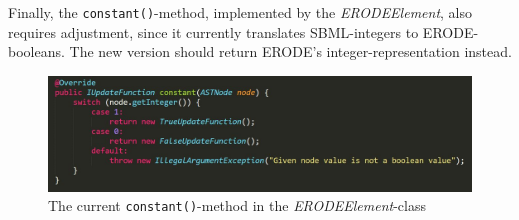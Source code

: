 Finally, the \texttt{constant()}-method, implemented by the \emph{ERODEElement}, also requires adjustment, since it currently translates SBML-integers to ERODE-booleans. The new version should return ERODE's integer-representation instead.

\begin{figure}[H]
    \centering
    \includegraphics[scale=0.5]{Sections/Images/ERODEconstant.JPG}
    \caption{The current \texttt{constant()}-method in the \emph{ERODEElement}-class}
    \label{fig:ERODEconstant}
\end{figure}